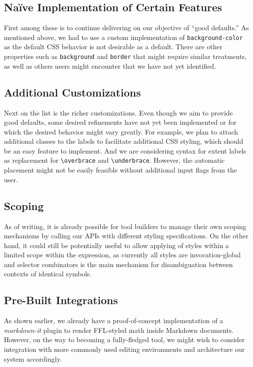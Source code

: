 \documentclass{article}
\begin{document}
\begin{multicols*}{2}
  \subsection*{Naïve Implementation of Certain Features}
  First among these is to continue delivering on our objective of ``good defaults.''
  As mentioned above, we had to use a custom implementation of \texttt{background-color}
  as the default CSS behavior is not desirable as a default. There are other properties
  such as \texttt{background} and \texttt{border} that might require similar treatments,
  as well as others users might encounter that we have not yet identified.
  \subsection*{Additional Customizations}
  Next on the list is the richer customizations. Even though we aim to provide
  good defaults, some desired refinements have not yet been implemented or for
  which the desired behavior might vary greatly. For example, we plan to attach
  additional classes to the labels to facilitate additional CSS styling, which
  should be an easy feature to implement. And we are considering syntax for
  extent labels as replacement for \texttt{\textbackslash overbrace} and \texttt{\textbackslash underbrace}.
  However, the automatic placement might not be easily feasible without additional
  input flags from the user.
  \subsection*{Scoping}
  As of writing, it is already possible for tool builders to manage their own scoping
  mechanisms by calling our APIs with different styling specifications.
  On the other hand, it could still be potentially useful to allow applying of styles within a limited
  scope within the expression, as currently all styles are invocation-global and
  selector combinators is the main mechanism for disambiguation between contexts
  of identical symbols.
  \subsection*{Pre-Built Integrations}
  As shown earlier, we already have a proof-of-concept implementation of a \textit{markdown-it}
  plugin to render FFL-styled math inside Markdown documents. However, on the way to
  becoming a fully-fledged tool, we might wish to consider integration with more
  commonly used editing environments and architecture our system accordingly.

\end{multicols*}
\end{document}
